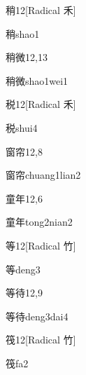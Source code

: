 \begin{entry}{稍}{12}[Radical 禾]
  \begin{phonetics}{稍}{shao1}
  \end{phonetics}
\end{entry}

\begin{entry}{稍微}{12,13}
  \begin{phonetics}{稍微}{shao1wei1}
  \end{phonetics}
\end{entry}

\begin{entry}{税}{12}[Radical 禾]
  \begin{phonetics}{税}{shui4}
  \end{phonetics}
\end{entry}

\begin{entry}{窗帘}{12,8}
  \begin{phonetics}{窗帘}{chuang1lian2}
  \end{phonetics}
\end{entry}

\begin{entry}{童年}{12,6}
  \begin{phonetics}{童年}{tong2nian2}
  \end{phonetics}
\end{entry}

\begin{entry}{等}{12}[Radical 竹]
  \begin{phonetics}{等}{deng3}
  \end{phonetics}
\end{entry}

\begin{entry}{等待}{12,9}
  \begin{phonetics}{等待}{deng3dai4}
  \end{phonetics}
\end{entry}

\begin{entry}{筏}{12}[Radical 竹]
  \begin{phonetics}{筏}{fa2}
  \end{phonetics}
\end{entry}

